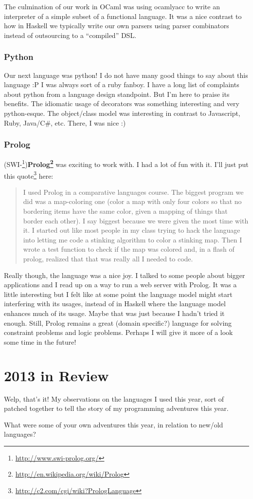 \documentclass[]{article}
\renewcommand{\href}[2]{#2\footnote{\url{#1}}}
\begin{document}
The culmination of our work in OCaml was using ocamlyacc to write an interpreter of a simple subset
of a functional language. It was a nice contrast to how in Haskell we typically write our own
parsers using parser combinators instead of outsourcing to a ``compiled'' DSL.

\subsubsection{Python}\label{python}

Our next language was python! I do not have many good things to say about this language :P I was
always sort of a ruby fanboy. I have a long list of complaints about python from a language design
standpoint. But I'm here to praise its benefits. The idiomatic usage of decorators was something
interesting and very python-esque. The object/class model was interesting in contrast to Javascript,
Ruby, Java/C\#, etc. There, I was nice :)

\subsubsection{Prolog}\label{prolog}

(\href{http://www.swi-prolog.org/}{SWI-})\textbf{\href{http://en.wikipedia.org/wiki/Prolog}{Prolog}}
was exciting to work with. I had a lot of fun with it. I'll just put
\href{http://c2.com/cgi/wiki?PrologLanguage}{this quote} here:

\begin{quote}
I used Prolog in a comparative languages course. The biggest program we did was a map-coloring one
(color a map with only four colors so that no bordering items have the same color, given a mapping
of things that border each other). I say biggest because we were given the most time with it. I
started out like most people in my class trying to hack the language into letting me code a stinking
algorithm to color a stinking map. Then I wrote a test function to check if the map was colored and,
in a flash of prolog, realized that that was really all I needed to code.
\end{quote}

Really though, the language was a nice joy. I talked to some people about bigger applications and I
read up on a way to run a web server with Prolog. It was a little interesting but I felt like at
some point the language model might start interfering with its usages, instead of in Haskell where
the language model enhances much of its usage. Maybe that was just because I hadn't tried it enough.
Still, Prolog remains a great (domain specific?) language for solving constraint problems and logic
problems. Perhaps I will give it more of a look some time in the future!

\section{2013 in Review}\label{in-review}

Welp, that's it! My observations on the languages I used this year, sort of patched together to tell
the story of my programming adventures this year.

What were some of your own adventures this year, in relation to new/old languages?
\end{document}
